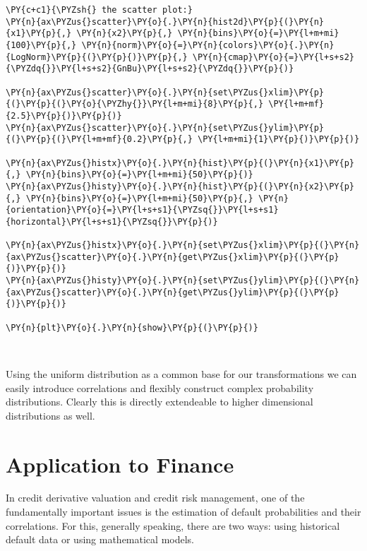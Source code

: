 \begin{tcolorbox}[breakable, size=fbox, boxrule=1pt, pad at break*=1mm,colback=cellbackground, colframe=cellborder]
\begin{Verbatim}[commandchars=\\\{\}]
\PY{c+c1}{\PYZsh{} the scatter plot:}
\PY{n}{ax\PYZus{}scatter}\PY{o}{.}\PY{n}{hist2d}\PY{p}{(}\PY{n}{x1}\PY{p}{,} \PY{n}{x2}\PY{p}{,} \PY{n}{bins}\PY{o}{=}\PY{l+m+mi}{100}\PY{p}{,} \PY{n}{norm}\PY{o}{=}\PY{n}{colors}\PY{o}{.}\PY{n}{LogNorm}\PY{p}{(}\PY{p}{)}\PY{p}{,} \PY{n}{cmap}\PY{o}{=}\PY{l+s+s2}{\PYZdq{}}\PY{l+s+s2}{GnBu}\PY{l+s+s2}{\PYZdq{}}\PY{p}{)}

\PY{n}{ax\PYZus{}scatter}\PY{o}{.}\PY{n}{set\PYZus{}xlim}\PY{p}{(}\PY{p}{(}\PY{o}{\PYZhy{}}\PY{l+m+mi}{8}\PY{p}{,} \PY{l+m+mf}{2.5}\PY{p}{)}\PY{p}{)}
\PY{n}{ax\PYZus{}scatter}\PY{o}{.}\PY{n}{set\PYZus{}ylim}\PY{p}{(}\PY{p}{(}\PY{l+m+mf}{0.2}\PY{p}{,} \PY{l+m+mi}{1}\PY{p}{)}\PY{p}{)}

\PY{n}{ax\PYZus{}histx}\PY{o}{.}\PY{n}{hist}\PY{p}{(}\PY{n}{x1}\PY{p}{,} \PY{n}{bins}\PY{o}{=}\PY{l+m+mi}{50}\PY{p}{)}
\PY{n}{ax\PYZus{}histy}\PY{o}{.}\PY{n}{hist}\PY{p}{(}\PY{n}{x2}\PY{p}{,} \PY{n}{bins}\PY{o}{=}\PY{l+m+mi}{50}\PY{p}{,} \PY{n}{orientation}\PY{o}{=}\PY{l+s+s1}{\PYZsq{}}\PY{l+s+s1}{horizontal}\PY{l+s+s1}{\PYZsq{}}\PY{p}{)}

\PY{n}{ax\PYZus{}histx}\PY{o}{.}\PY{n}{set\PYZus{}xlim}\PY{p}{(}\PY{n}{ax\PYZus{}scatter}\PY{o}{.}\PY{n}{get\PYZus{}xlim}\PY{p}{(}\PY{p}{)}\PY{p}{)}
\PY{n}{ax\PYZus{}histy}\PY{o}{.}\PY{n}{set\PYZus{}ylim}\PY{p}{(}\PY{n}{ax\PYZus{}scatter}\PY{o}{.}\PY{n}{get\PYZus{}ylim}\PY{p}{(}\PY{p}{)}\PY{p}{)}

\PY{n}{plt}\PY{o}{.}\PY{n}{show}\PY{p}{(}\PY{p}{)}
\end{Verbatim}
\end{tcolorbox}

    \begin{center}
    \end{center}
    { \hspace*{\fill} \\}
    
    Using the uniform distribution as a common base for our transformations
we can easily introduce correlations and flexibly construct complex
probability distributions. Clearly this is directly extendeable to
higher dimensional distributions as well.

\section{Application to Finance}\label{application-to-finance}

In credit derivative valuation and credit risk management, one of the
fundamentally important issues is the estimation of default
probabilities and their correlations. For this, generally speaking,
there are two ways: using historical default data or using mathematical
models.

